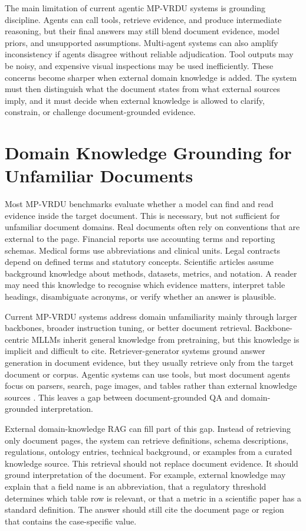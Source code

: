 \documentclass[10pt,a4paper]{article}
\begin{document}
The main limitation of current agentic MP-VRDU systems is grounding discipline. Agents can call tools, retrieve evidence, and produce intermediate reasoning, but their final answers may still blend document evidence, model priors, and unsupported assumptions. Multi-agent systems can also amplify inconsistency if agents disagree without reliable adjudication. Tool outputs may be noisy, and expensive visual inspections may be used inefficiently. These concerns become sharper when external domain knowledge is added. The system must then distinguish what the document states from what external sources imply, and it must decide when external knowledge is allowed to clarify, constrain, or challenge document-grounded evidence.

\section{Domain Knowledge Grounding for Unfamiliar Documents}

Most MP-VRDU benchmarks evaluate whether a model can find and read evidence inside the target document. This is necessary, but not sufficient for unfamiliar document domains. Real documents often rely on conventions that are external to the page. Financial reports use accounting terms and reporting schemas. Medical forms use abbreviations and clinical units. Legal contracts depend on defined terms and statutory concepts. Scientific articles assume background knowledge about methods, datasets, metrics, and notation. A reader may need this knowledge to recognise which evidence matters, interpret table headings, disambiguate acronyms, or verify whether an answer is plausible.

Current MP-VRDU systems address domain unfamiliarity mainly through larger backbones, broader instruction tuning, or better document retrieval. Backbone-centric MLLMs inherit general knowledge from pretraining, but this knowledge is implicit and difficult to cite. Retriever-generator systems ground answer generation in document evidence, but they usually retrieve only from the target document or corpus. Agentic systems can use tools, but most document agents focus on parsers, search, page images, and tables rather than external knowledge sources \cite{sun2025docagent,zhu2025doclens,zhang2026docdancer}. This leaves a gap between document-grounded QA and domain-grounded interpretation.

External domain-knowledge RAG can fill part of this gap. Instead of retrieving only document pages, the system can retrieve definitions, schema descriptions, regulations, ontology entries, technical background, or examples from a curated knowledge source. This retrieval should not replace document evidence. It should ground interpretation of the document. For example, external knowledge may explain that a field name is an abbreviation, that a regulatory threshold determines which table row is relevant, or that a metric in a scientific paper has a standard definition. The answer should still cite the document page or region that contains the case-specific value.
\end{document}
